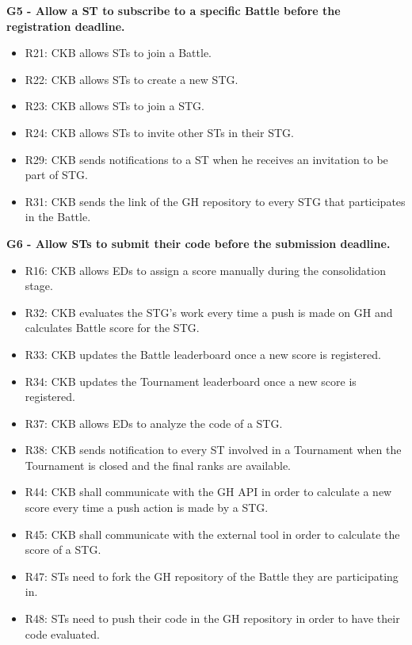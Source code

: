 \vspace{1.5cm}
\textbf{G5 - Allow a ST to subscribe to a specific Battle before the registration deadline.}
\begin{itemize}
    \item R21: CKB allows STs to join a Battle.
    \item R22: CKB allows STs to create a new STG.
    \item R23: CKB allows STs to join a STG.
    \item R24: CKB allows STs to invite other STs in their STG.
    \item R29: CKB sends notifications to a ST when he receives an invitation to be part of STG.
    \item R31: CKB sends the link of the GH repository to every STG that participates in the Battle.
\end{itemize}


\vspace{1.5cm}
\textbf{G6 - Allow STs to submit their code before the submission deadline.}
\begin{itemize}
    \item R16: CKB allows EDs to assign a score manually during the consolidation stage.
    \item R32: CKB evaluates the STG's work every time a push is made on GH and calculates Battle score for the STG.
    \item R33: CKB updates the Battle leaderboard once a new score is registered.
    \item R34: CKB updates the Tournament leaderboard once a new score is registered.
    \item R37: CKB allows EDs to analyze the code of a STG.
    \item R38: CKB sends notification to every ST involved in a Tournament when the Tournament is closed and the final ranks are available.
    \item R44: CKB shall communicate with the GH API in order to calculate a new score every time a push action is made by a STG.
    \item R45: CKB shall communicate with the external tool in order to calculate the score of a STG.
    \item R47: STs need to fork the GH repository of the Battle they are participating in.
    \item R48: STs need to push their code in the GH repository in order to have their code evaluated.
\end{itemize}


